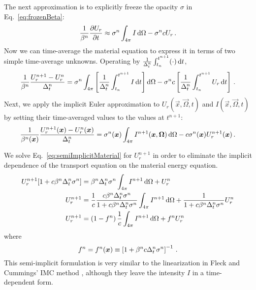 The next approximation is to explicitly freeze the opacity $\sigma$ in
Eq.~\eqref{eq:frozenBeta}:
\begin{equation*}
  \frac{1}{\beta^n}
  \frac{\partial U_r}{\partial t} \approx \sigma^n \int_{4\pi}  I \mathop{}\!\mathrm{d} \Omega - \sigma^n c U_r \,.
\end{equation*}
Now we can time-average the material equation to express it in terms of two
simple time-average unknowns. Operating by
$\frac{1}{\Delta_t^n}\int_{t_n}^{t^{n+1}} (\cdot) \mathop{}\!\mathrm{d} t$,
\begin{equation*}
  \frac{1}{\beta^n}
  \frac{U_r^{n+1} - U_r^n}{\Delta_t^n} = \sigma^n \int_{4\pi} \left[
  \frac{1}{\Delta_t^n}\int_{t_n}^{t^{n+1}} I\mathop{}\!\mathrm{d} t
  \right] \mathop{}\!\mathrm{d} \Omega - \sigma^n c \left[
  \frac{1}{\Delta_t^n}\int_{t_n}^{t^{n+1}} U_r \mathop{}\!\mathrm{d} t \right]\,.
\end{equation*}
Next, we apply the implicit Euler approximation to $U_r(\vec{x}, \vec{\Omega},
t)$ and $I(\vec{x}, \vec{\Omega}, t)$ by setting their time-averaged values to
the values at $t^{n+1}$:
\begin{equation} \label{eq:semiImplicitMaterial}
  \frac{1}{\beta^n(\bm{x})}
  \frac{U_r^{n+1}(\bm{x}) - U_r^n(\bm{x})}{\Delta_t^n}
  = \sigma^n(\bm{x}) \int_{4\pi} I^{n+1}(\bm{x}, \bm{\Omega})\mathop{}\!\mathrm{d} \Omega
  - c \sigma^n(\bm{x}) U_r^{n+1}(\bm{x}) \,.
\end{equation}

We solve Eq.~\eqref{eq:semiImplicitMaterial} for $U_r^{n+1}$ in order to
eliminate the implicit dependence of the transport equation on the material
energy equation.
\begin{align} \nonumber
  U_r^{n+1} [ 1 + c \beta^n \Delta_t^n \sigma^n ]
  &= \beta^n \Delta_t^n \sigma^n\int_{4\pi} I^{n+1}\mathop{}\!\mathrm{d} \Omega + U_r^n
   \\ \nonumber
  U_r^{n+1}
  &= \frac1c \frac{ c \beta^n \Delta_t^n \sigma^n }{ 1 + c \beta^n \Delta_t^n \sigma^n}
  \int_{4\pi} I^{n+1}\mathop{}\!\mathrm{d} \Omega + \frac1{ 1 + c \beta^n \Delta_t^n \sigma^n}
  U_r^n
  \\ \label{eq:urNPlusOne}
  U_r^{n+1}
  &= \left(1 - f^n\right) \frac1c \int_{4\pi} I^{n+1}\mathop{}\!\mathrm{d} \Omega + f^n U_r^n
\end{align}
where
\begin{equation} \label{eq:fleckFactor}
  f^n = f^n(\bm{x}) \equiv \left[ 1 + \beta^n c \Delta_t^n \sigma^n
  \right]^{-1} \,.
\end{equation}
This semi-implicit formulation is very similar to the linearization in Fleck
and Cummings' IMC method \cite{Fle1971}, although they leave the intensity $I$
in a time-dependent form.

